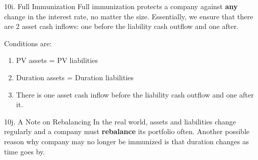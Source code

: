 \begin{CHPT_SUMM_AUTO}[label = {L.-10i}]{10i. Full Immunization}
Full immunization protects a company against \textbf{any} change in the interest rate, no matter the size. Essentially, we ensure that there are 2 asset cash inflows: one before the liability cash outflow and one after.

Conditions are:
\begin{enumerate}
	\item	PV assets = PV liabilities
	\item	Duration assets = Duration liabilities
	\item	There is one asset cash inflow before the liability cash outflow and one after it.
\end{enumerate}
\end{CHPT_SUMM_AUTO}

\begin{CHPT_SUMM_AUTO}[label = {L.-10j}]{10j. A Note on Rebalancing}
In the real world, assets and liabilities change regularly and a company must \textbf{rebalance} its portfolio often. Another possible reason why company may no longer be immunized is that duration changes as time goes by.
\end{CHPT_SUMM_AUTO}

